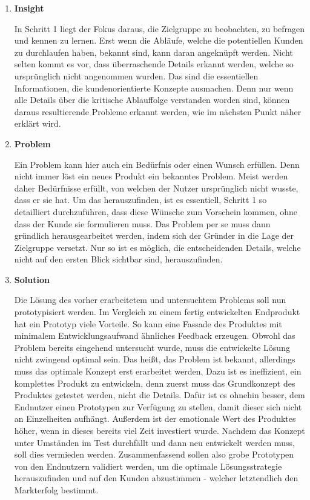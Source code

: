 \begin{enumerate}
	\item \textbf{Insight}
	
	In Schritt 1 liegt der Fokus daraus, die Zielgruppe zu beobachten, zu befragen und kennen zu lernen. Erst wenn die Abläufe, welche die potentiellen Kunden zu durchlaufen haben, bekannt sind, kann daran angeknüpft werden. Nicht selten kommt es vor, dass überraschende Details erkannt werden, welche so ursprünglich nicht angenommen wurden. Das sind die essentiellen Informationen, die kundenorientierte Konzepte ausmachen. Denn nur wenn alle Details über die kritische Ablauffolge verstanden worden sind, können daraus resultierende Probleme erkannt werden, wie im nächsten Punkt näher erklärt wird. 
	
	\item \textbf{Problem}
	
	Ein Problem kann hier auch ein Bedürfnis oder einen Wunsch erfüllen. Denn nicht immer löst ein neues Produkt ein bekanntes Problem. Meist werden daher Bedürfnisse erfüllt, von welchen der Nutzer ursprünglich nicht wusste, dass er sie hat. Um das herauszufinden, ist es essentiell, Schritt 1 so detailliert durchzuführen, dass diese Wünsche zum Vorschein kommen, ohne dass der Kunde sie formulieren muss. Das Problem per se muss dann gründlich herausgearbeitet werden, indem sich der Gründer in die Lage der Zielgruppe versetzt. Nur so ist es möglich, die entscheidenden Details, welche nicht auf den ersten Blick sichtbar sind, herauszufinden.
	
	\item \textbf{Solution}
	
	Die Lösung des vorher erarbeitetem und untersuchtem Problems soll nun prototypisiert werden. Im Vergleich zu einem fertig entwickelten Endprodukt hat ein Prototyp viele Vorteile. So kann eine Fassade des Produktes mit minimalem Entwicklungsaufwand ähnliches Feedback erzeugen. Obwohl das Problem bereits eingehend untersucht wurde, muss die entwickelte Lösung nicht zwingend optimal sein. Das heißt, das Problem ist bekannt, allerdings muss das optimale Konzept erst erarbeitet werden. Dazu ist es ineffizient, ein komplettes Produkt zu entwickeln, denn zuerst muss das Grundkonzept des Produktes getestet werden, nicht die Details. Dafür ist es ohnehin besser, dem Endnutzer einen Prototypen zur Verfügung zu stellen, damit dieser sich nicht an Einzelheiten aufhängt. Außerdem ist der emotionale Wert des Produktes höher, wenn in dieses bereits viel Zeit investiert wurde. Nachdem das Konzept unter Umständen im Test durchfällt und dann neu entwickelt werden muss, soll dies vermieden werden. Zusammenfassend sollen also grobe Prototypen von den Endnutzern validiert werden, um die optimale Lösungsstrategie herauszufinden und auf den Kunden abzustimmen - welcher letztendlich den Markterfolg bestimmt.
	

\end{enumerate}
